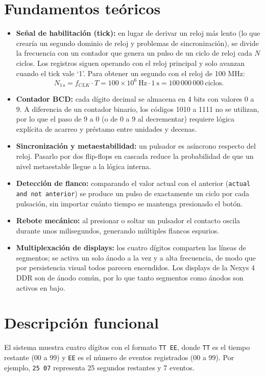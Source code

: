 \documentclass[letterpaper,12pt]{article}
\begin{document}
\section{Fundamentos teóricos}
\begin{itemize}
    \item \textbf{Señal de habilitación (tick):} en lugar de derivar un reloj más lento (lo que crearía un segundo dominio de reloj y problemas de sincronización), se divide la frecuencia con un contador que genera un pulso de un ciclo de reloj cada $N$ ciclos. Los registros siguen operando con el reloj principal y solo avanzan cuando el tick vale `1'. Para obtener un segundo con el reloj de 100 MHz:
    \[
        N_{1\,\mathrm{s}} = f_{CLK}\cdot T = 100\times10^{6}\ \mathrm{Hz}\cdot 1\ \mathrm{s} = 100\,000\,000\ \text{ciclos}.
    \]
    \item \textbf{Contador BCD:} cada dígito decimal se almacena en 4 bits con valores 0 a 9. A diferencia de un contador binario, los códigos 1010 a 1111 no se utilizan, por lo que el paso de 9 a 0 (o de 0 a 9 al decrementar) requiere lógica explícita de acarreo y préstamo entre unidades y decenas.
    \item \textbf{Sincronización y metaestabilidad:} un pulsador es asíncrono respecto del reloj. Pasarlo por dos flip-flops en cascada reduce la probabilidad de que un nivel metaestable llegue a la lógica interna.
    \item \textbf{Detección de flanco:} comparando el valor actual con el anterior (\texttt{actual and not anterior}) se produce un pulso de exactamente un ciclo por cada pulsación, sin importar cuánto tiempo se mantenga presionado el botón.
    \item \textbf{Rebote mecánico:} al presionar o soltar un pulsador el contacto oscila durante unos milisegundos, generando múltiples flancos espurios.
    \item \textbf{Multiplexación de displays:} los cuatro dígitos comparten las líneas de segmentos; se activa un solo ánodo a la vez y a alta frecuencia, de modo que por persistencia visual todos parecen encendidos. Los displays de la Nexys 4 DDR son de ánodo común, por lo que tanto segmentos como ánodos son activos en bajo.
\end{itemize}

\section{Descripción funcional}
El sistema muestra cuatro dígitos con el formato \texttt{TT EE}, donde \texttt{TT} es el tiempo restante (00 a 99) y \texttt{EE} es el número de eventos registrados (00 a 99). Por ejemplo, \texttt{25 07} representa 25 segundos restantes y 7 eventos.
\end{document}
